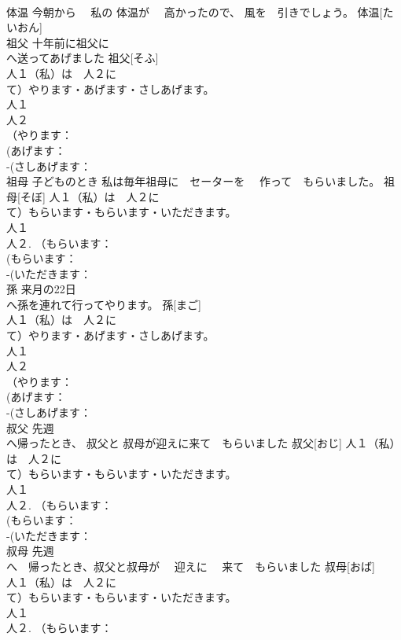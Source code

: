 \documentclass[8pt]{extreport}
\begin{document}
\begin{CJK}{UTF8}{min}
\\	体温	今朝から　 私の 体温が　 高かったので、 風を　引きでしょう。	体温[たいおん]					
\\	祖父	十年前に祖父に 
\\	へ送ってあげました	祖父[そふ]			
\\	人１（私）は　人２に　
\\	て）やります・あげます・さしあげます。
\\	人１
\\	人２
\\	（やります：
\\	(あげます：
\\	-(さしあげます：
\\	祖母	子どものとき 私は毎年祖母に　セーターを　 作って　もらいました。	祖母[そぼ]				人１（私）は　人２に　
\\	て）もらいます・もらいます・いただきます。
\\	人１
\\	人２. （もらいます：
\\	(もらいます：
\\	-(いただきます：
\\	孫	来月の22日 
\\	へ孫を連れて行ってやります。	孫[まご]			
\\	人１（私）は　人２に　
\\	て）やります・あげます・さしあげます。
\\	人１
\\	人２
\\	（やります：
\\	(あげます：
\\	-(さしあげます：
\\	叔父	先週
\\	へ帰ったとき、 叔父と 叔母が迎えに来て　もらいました	叔父[おじ]				人１（私）は　人２に　
\\	て）もらいます・もらいます・いただきます。
\\	人１
\\	人２. （もらいます：
\\	(もらいます：
\\	-(いただきます：
\\	叔母	先週　
\\	へ　帰ったとき、叔父と叔母が　 迎えに　 来て　もらいました	叔母[おば]			
\\	人１（私）は　人２に　
\\	て）もらいます・もらいます・いただきます。
\\	人１
\\	人２. （もらいます：

\end{CJK}
\end{document}
